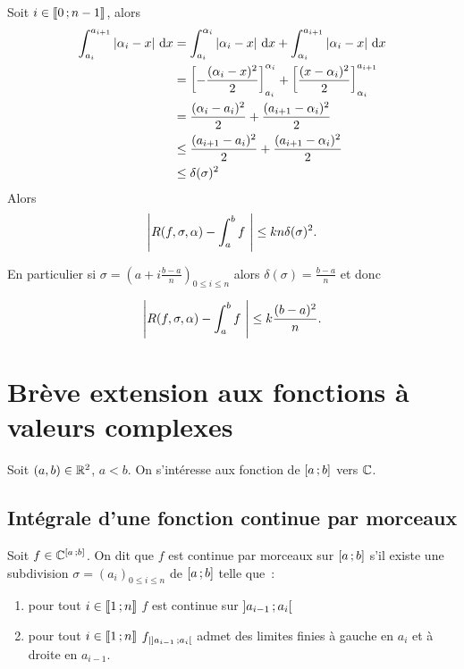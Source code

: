 Soit $i \in \mathopen{\llbracket}0\mathclose{}\mathpunct{};n-1\mathclose{\rrbracket}$, alors
\begin{align}
  \int_{a_i}^{a_{i+1}} \left\lvert\alpha_i-x\right\rvert\,\mathop{}\mathopen{}\mathrm{d} x &= \int_{a_i}^{\alpha_i} \left\lvert\alpha_i-x\right\rvert\,\mathop{}\mathopen{}\mathrm{d} x + \int_{\alpha_i}^{a_{i+1}} \left\lvert\alpha_i-x\right\rvert\,\mathop{}\mathopen{}\mathrm{d} x \\
&= \left[ -\frac{(\alpha_i-x)^2}{2}\right]_{a_i}^{\alpha_i} + \left[\frac{(x-\alpha_i)^2}{2}\right]_{\alpha_i}^{a_{i+1}} \\
&= \frac{(\alpha_i-a_i)^2}{2} + \frac{(a_{i+1}-\alpha_i)^2}{2} \\
& \leq \frac{(a_{i+1}-a_i)^2}{2} + \frac{(a_{i+1}-\alpha_i)^2}{2} \\
& \leq \delta(\sigma)^2
\end{align}
Alors
\begin{equation}
  \left\lvert R(f,\sigma,\alpha)- \int_a^b f~\right\rvert \leq kn \delta(\sigma)^2.
\end{equation}

En particulier si $\sigma = \left(a+i \frac{b-a}{n}\right)_{0 \leq i \leq n}$ alors $\delta(\sigma)=\frac{b-a}{n}$ et donc

\begin{equation}
  \left\lvert R(f,\sigma,\alpha)- \int_a^b f~\right\rvert \leq k \frac{(b-a)^2}{n}.
\end{equation}

\section{Brève extension aux fonctions à valeurs complexes}

Soit $(a,b) \in \mathbb{R}^2$, $a<b$. On s'intéresse aux fonction de $\left[ a \, ;  b \right]$ vers $\mathbb{C}$.

\subsection{Intégrale d'une fonction continue par morceaux}

\begin{defdef}
  Soit $f \in \mathbb{C}^{\left[ a \, ;  b \right]}$. On dit que $f$ est continue par morceaux sur $\left[ a \, ;  b \right]$ s'il existe une subdivision $\sigma=(a_i)_{0 \leq i \leq n}$ de $\left[ a \, ;  b \right]$ telle que~:
  \begin{enumerate}
  \item pour tout $i \in \mathopen{\llbracket}1\mathclose{}\mathpunct{};n\mathclose{\rrbracket}$ $f$ est continue sur $\left] a_{i-1} \, ;  a_i \right[$
  \item pour tout $i \in \mathopen{\llbracket}1\mathclose{}\mathpunct{};n\mathclose{\rrbracket}$ $f_{|\left] a_{i-1} \, ;  a_i \right[}$ admet des limites finies à gauche en $a_i$ et à droite en $a_{i-1}$.
  \end{enumerate}
\end{defdef}

